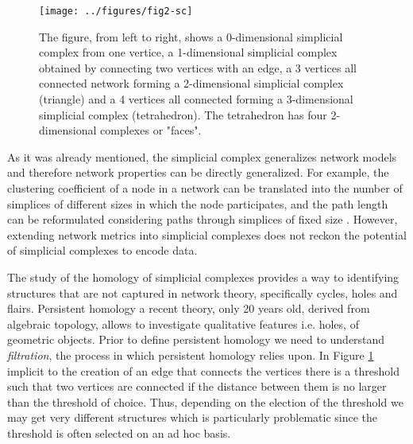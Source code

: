 \documentclass[onecollarge,runningheads]{svjour2}
\begin{document}
\begin{figure}[h]
        \centering
        \texttt{[image: ../figures/fig2-sc]}
        \caption{The figure, from left to right, shows a 0-dimensional simplicial complex from one vertice, a 1-dimensional simplicial complex obtained by connecting two vertices with an edge, a 3 vertices all connected network forming a 2-dimensional simplicial complex (triangle) and a 4 vertices all connected forming a 3-dimensional simplicial complex (tetrahedron). The tetrahedron has four 2-dimensional complexes or "faces".}
\label{fig:vrcomplex}
\end{figure}
As it was already mentioned, the simplicial complex generalizes network models and therefore network properties can be directly generalized. For example, the clustering coefficient of a node in a network can be translated into the number of simplices of different sizes in which the node participates, and the path length can be reformulated considering paths through simplices of fixed size \cite{dotko2016topological}. However, extending network metrics into simplicial complexes does not reckon the potential of simplicial complexes to encode data.

The study of the homology of simplicial complexes provides a way to identifying structures that are not captured in network theory, specifically cycles, holes and flairs. Persistent homology a recent theory, only 20 years old, derived from algebraic topology, allows to investigate qualitative features i.e. holes, of geometric objects. Prior to define persistent homology we need to understand \emph{filtration}, the process in which persistent homology relies upon. In Figure \ref{fig:vrcomplex} implicit to the creation of an edge that connects the vertices there is a threshold such that two vertices are connected if the distance between them is no larger than the threshold of choice. Thus, depending on the election of the threshold we may get very different structures which is particularly problematic since the threshold is often selected on an ad hoc basis. 
\end{document}
